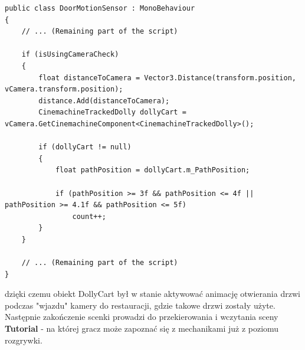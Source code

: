 \begin{codebox}
\begin{lstlisting}[language={[Sharp]C}, label={listing:DoorMotionSensor.cs}]
public class DoorMotionSensor : MonoBehaviour
{
    // ... (Remaining part of the script)
    
    if (isUsingCameraCheck)
    {
        float distanceToCamera = Vector3.Distance(transform.position, vCamera.transform.position);
        distance.Add(distanceToCamera);
        CinemachineTrackedDolly dollyCart = vCamera.GetCinemachineComponent<CinemachineTrackedDolly>();
        
        if (dollyCart != null)
        {
            float pathPosition = dollyCart.m_PathPosition;
            
            if (pathPosition >= 3f && pathPosition <= 4f || pathPosition >= 4.1f && pathPosition <= 5f)
                count++;
        }
    }
            
    // ... (Remaining part of the script)
}
\end{lstlisting}
\end{codebox}
dzięki czemu obiekt DollyCart był w stanie aktywować animację otwierania drzwi podczas "wjazdu" kamery do restauracji, gdzie takowe drzwi zostały użyte.
Następnie zakończenie scenki prowadzi do przekierowania i wczytania sceny \textbf{Tutorial} - na której gracz może zapoznać się z mechanikami już z poziomu rozgrywki.